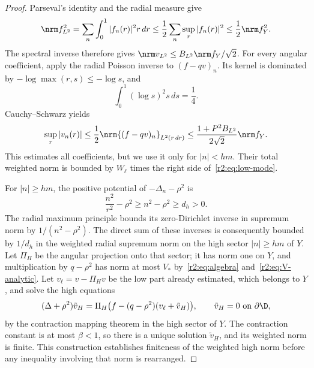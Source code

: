 \begin{proof}
Parseval's identity and the radial measure give
\[
 \nrm f_{L^2}^2=\sum_n\int_0^1|f_n(r)|^2r\,dr
 \le\frac12\sum_n\sup_r|f_n(r)|^2\le\frac12\nrm f_Y^2.
\]
The spectral inverse therefore gives $\nrm v_{L^2}\le B_{L^2}\nrm f_Y/\sqrt2$. For every angular coefficient, apply the radial Poisson inverse to $(f-qv)_n$. Its kernel is dominated by $-\log\max(r,s)\le-\log s$, and
\[
 \int_0^1(\log s)^2s\,ds=\frac14.
\]
Cauchy--Schwarz yields
\begin{equation}\label{r2:eq:low-mode}
 \sup_r|v_n(r)|\le\frac12\nrm{(f-qv)_n}_{L^2(r\,dr)}
 \le\frac{1+P^2B_{L^2}}{2\sqrt2}\nrm f_Y.
\end{equation}
This estimates all coefficients, but we use it only for $|n|<hm$. Their total weighted norm is bounded by $W_\ell$ times the right side of~\eqref{r2:eq:low-mode}.

For $|n|\ge hm$, the positive potential of $-\Delta_n-\rho^2$ is
\[
 \frac{n^2}{r^2}-\rho^2\ge n^2-\rho^2\ge d_h>0.
\]
The radial maximum principle bounds its zero-Dirichlet inverse in supremum norm by $1/(n^2-\rho^2)$. The direct sum of these inverses is consequently bounded by $1/d_h$ in the weighted radial supremum norm on the high sector $|n|\ge hm$ of $Y$. Let $\Pi_H$ be the angular projection onto that sector; it has norm one on $Y$, and multiplication by $q-\rho^2$ has norm at most $V_*$ by~\eqref{r2:eq:algebra} and~\eqref{r2:eq:V-analytic}. Let $v_\ell=v-\Pi_Hv$ be the low part already estimated, which belongs to $Y$, and solve the high equations
\[
 (\Delta+\rho^2)\tilde v_H=\Pi_H\bigl(f-(q-\rho^2)(v_\ell+\tilde v_H)\bigr),
 \qquad\tilde v_H=0\ \text{on }\partial\D,
\]
by the contraction mapping theorem in the high sector of $Y$. The contraction constant is at most $\beta<1$, so there is a unique solution $\tilde v_H$, and its weighted norm is finite. This construction establishes finiteness of the weighted high norm before any inequality involving that norm is rearranged.


\end{proof}

